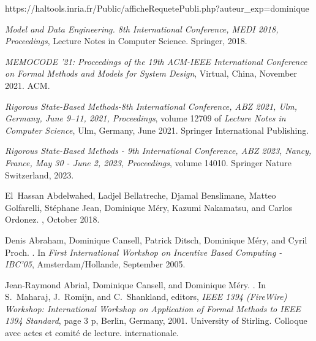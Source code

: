 \documentclass[ 12pt]{article}
\begin{document}
\rawhtml
[HAL]https://haltools.inria.fr/Public/afficheRequetePubli.php?auteur_exp=dominique%
\endrawhtml 




%

\begin{thebibliography}{100}

{\em {Model and Data Engineering. 8th International Conference, MEDI 2018,
  Proceedings}}, Lecture Notes in Computer Science. {Springer}, 2018.

{\em {MEMOCODE '21: Proceedings of the 19th ACM-IEEE International Conference
  on Formal Methods and Models for System Design}}, Virtual, China, November
  2021. {ACM}.

{\em {Rigorous State-Based Methods-8th International Conference, ABZ 2021, Ulm,
  Germany, June 9--11, 2021, Proceedings}}, volume 12709 of {\em Lecture Notes
  in Computer Science}, Ulm, Germany, June 2021. {Springer International
  Publishing}.

{\em {Rigorous State-Based Methods - 9th International Conference, ABZ 2023,
  Nancy, France, May 30 - June 2, 2023, Proceedings}}, volume 14010. {Springer
  Nature Switzerland}, 2023.

El~Hassan Abdelwahed, Ladjel Bellatreche, Djamal Benslimane, Matteo Golfarelli,
  St{\'e}phane Jean, Dominique M{\'e}ry, Kazumi Nakamatsu, and Carlos Ordonez.
, October 2018.

Denis Abraham, Dominique Cansell, Patrick Ditsch, Dominique M{\'e}ry, and Cyril
  Proch.
.
\newblock In {\em {First International Workshop on Incentive Based Computing -
  IBC'05}}, Amsterdam/Hollande, September 2005.

Jean-Raymond Abrial, Dominique Cansell, and Dominique M{\'e}ry.
.
\newblock In S.~Maharaj, J.~Romijn, and C.~Shankland, editors, {\em {IEEE 1394
  (FireWire) Workshop: International Workshop on Application of Formal Methods
  to IEEE 1394 Standard}}, page 3 p, Berlin, Germany, 2001. {University of
  Stirling}.
\newblock Colloque avec actes et comit{\'e} de lecture. internationale.


\end{thebibliography}
\end{document}

